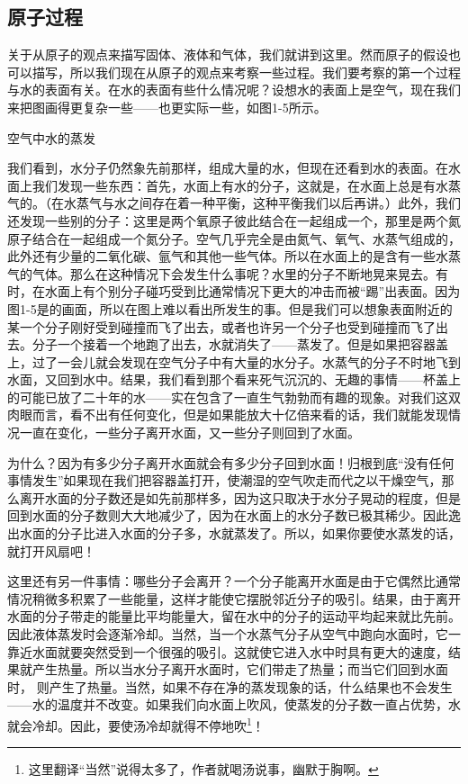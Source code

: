 \documentclass[12pt,oneside]{book}
\begin{document}
\begin{common-format}
\section{原子过程}
关于从原子的观点来描写固体、液体和气体，我们就讲到这里。然而原子的假设也可以描写，所以我们现在从原子的观点来考察一些过程。我们要考察的第一个过程与水的表面有关。在水的表面有些什么情况呢？设想水的表面上是空气，现在我们来把图画得更复杂一些——也更实际一些，如图1-5所示。
\begin{fig}{空气中水的蒸发}
\caption{空气中水的蒸发}
\label{fig:空气中水的蒸发}
\end{fig}
我们看到，水分子仍然象先前那样，组成大量的水，但现在还看到水的表面。在水面上我们发现一些东西：首先，水面上有水的分子，这就是，在水面上总是有水蒸气的。（在水蒸气与水之间存在着一种平衡，这种平衡我们以后再讲。）此外，我们还发现一些别的分子：这里是两个氧原子彼此结合在一起组成一个，那里是两个氮原子结合在一起组成一个氮分子。空气几乎完全是由氮气、氧气、水蒸气组成的，此外还有少量的二氧化碳、氩气和其他一些气体。所以在水面上的是含有一些水蒸气的气体。那么在这种情况下会发生什么事呢？水里的分子不断地晃来晃去。有时，在水面上有个别分子碰巧受到比通常情况下更大的冲击而被“踢”出表面。因为图1-5是的画面，所以在图上难以看出所发生的事。但是我们可以想象表面附近的某一个分子刚好受到碰撞而飞了出去，或者也许另一个分子也受到碰撞而飞了出去。分子一个接着一个地跑了出去，水就消失了——蒸发了。但是如果把容器盖上，过了一会儿就会发现在空气分子中有大量的水分子。水蒸气的分子不时地飞到水面，又回到水中。结果，我们看到那个看来死气沉沉的、无趣的事情——杯盖上的可能已放了二十年的水——实在包含了一直生气勃勃而有趣的现象。对我们这双肉眼而言，看不出有任何变化，但是如果能放大十亿倍来看的话，我们就能发现情况一直在变化，一些分子离开水面，又一些分子则回到了水面。

为什么？因为有多少分子离开水面就会有多少分子回到水面！归根到底“没有任何事情发生”如果现在我们把容器盖打开，使潮湿的空气吹走而代之以干燥空气，那么离开水面的分子数还是如先前那样多，因为这只取决于水分子晃动的程度，但是回到水面的分子数则大大地减少了，因为在水面上的水分子数已极其稀少。因此逸出水面的分子比进入水面的分子多，水就蒸发了。所以，如果你要使水蒸发的话，就打开风扇吧！

这里还有另一件事情：哪些分子会离开？一个分子能离开水面是由于它偶然比通常情况稍微多积累了一些能量，这样才能使它摆脱邻近分子的吸引。结果，由于离开水面的分子带走的能量比平均能量大，留在水中的分子的运动平均起来就比先前。因此液体蒸发时会逐渐冷却。当然，当一个水蒸气分子从空气中跑向水面时，它一靠近水面就要突然受到一个很强的吸引。这就使它进入水中时具有更大的速度，结果就产生热量。所以当水分子离开水面时，它们带走了热量；而当它们回到水面时， 则产生了热量。当然，如果不存在净的蒸发现象的话，什么结果也不会发生——水的温度并不改变。如果我们向水面上吹风，使蒸发的分子数一直占优势，水就会冷却。因此，要使汤冷却就得不停地吹\footnote{这里翻译“当然”说得太多了，作者就喝汤说事，幽默于胸啊。}！


\end{common-format}
\end{document}
